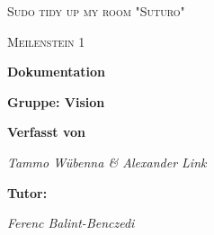 \documentclass[12pt,a4paper]{report}
\begin{document}
\begin{titlepage}
	\centering
	{\scshape\LARGE Sudo tidy up my room "Suturo" \par}
	\vspace{1.5cm}
	{\scshape\Large Meilenstein 1\par}
	\vspace{1.5cm}
	{\huge\bfseries Dokumentation \par}
	\vspace{0.5cm}
	{\LARGE\bfseries Gruppe: Vision \par}	
	\vspace{2.5cm}
	{\normalsize\bfseries Verfasst von \par}
	{\small\itshape Tammo W\"ubenna \& Alexander Link\par}	
	\vspace{2.5cm}
	{\normalsize\bfseries Tutor: \par}
	{\small\itshape Ferenc Balint-Benczedi\par}


	\vfill
\end{titlepage}
\end{document}

